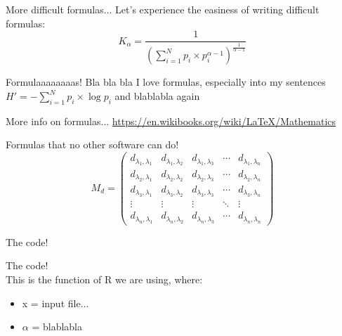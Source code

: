 \begin{frame}{More difficult formulas...}
Let's experience the easiness of writing difficult formulas:
\begin{equation}
K_{\alpha}=\frac{1}{\left( \sum_{i=1}^{N} p_i \times p_i^{\alpha-1} \right)^{\frac{1}{\alpha-1}}} %
\end{equation}
\end{frame}


\begin{frame}{Formulaaaaaaaas!}
Bla bla bla I love formulas, especially into my sentences
$H' = - \sum_{i=1}^{N} p_i \times \log{p_i}$ and blablabla again
\end{frame}

\begin{frame}{More info on formulas...}
\url{https://en.wikibooks.org/wiki/LaTeX/Mathematics}
\end{frame}

\begin{frame}{Formulas that no other software can do!}
    \begin{equation}
    M_d=
    \begin{pmatrix}
    d_{\lambda_1,\lambda_1} & d_{\lambda_1,\lambda_2} & d_{\lambda_1,\lambda_3} & \cdots & d_{\lambda_1,\lambda_n} \\
    d_{\lambda_2,\lambda_1} & d_{\lambda_2,\lambda_2} & d_{\lambda_2,\lambda_3} & \cdots & d_{\lambda_2,\lambda_n} \\
    d_{\lambda_3,\lambda_1} & d_{\lambda_3,\lambda_2} & d_{\lambda_3,\lambda_3} & \cdots & d_{\lambda_3,\lambda_n} \\
    \vdots  & \vdots  & \vdots  & \ddots & \vdots  \\
    d_{\lambda_n,\lambda_1} & d_{\lambda_n,\lambda_2} & d_{\lambda_n,\lambda_3} & \cdots & d_{\lambda_n,\lambda_n}
    \end{pmatrix}
    \end{equation}
\end{frame}

\begin{frame}{The code!}
    
\end{frame}

\begin{frame}{The code!}
     \\
    \bigskip
    This is the function of R we are using, where:
    \begin{itemize}
        \item x = input file...
        \item $\alpha$ = blablabla %
    \end{itemize}
\end{frame}

